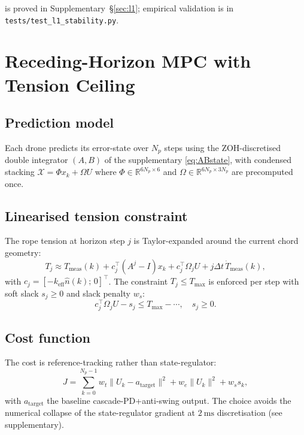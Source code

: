 \documentclass[journal,twocolumn,10pt]{IEEEtran}
\begin{document}
 is proved in Supplementary~§\ref{sec:l1};
empirical validation is in \texttt{tests/test\_l1\_stability.py}.

\section{Receding-Horizon MPC with Tension Ceiling}
\label{sec:mpc}

\subsection{Prediction model}
Each drone predicts its error-state over $N_p$ steps using the
ZOH-discretised double integrator $(A,B)$ of the supplementary
\eqref{eq:ABstate}, with condensed stacking
$\mathcal X = \Phi x_k + \Omega U$ where $\Phi\in\mathbb R^{6N_p\times 6}$
and $\Omega\in\mathbb R^{6N_p\times 3N_p}$ are precomputed once.

\subsection{Linearised tension constraint}
The rope tension at horizon step $j$ is Taylor-expanded around the
current chord geometry:
\begin{equation}
T_j \approx T_\text{meas}(k) + c_j^\top (A^j-I) x_k
                            + c_j^\top \Omega_j U
                            + j\Delta t\,\dot T_\text{meas}(k),
\label{eq:mpc-tension}
\end{equation}
with $c_j = [-k_\text{eff}\hat n(k);\,0]^\top$. The constraint
$T_j\le T_\text{max}$ is enforced per step with soft slack $s_j\ge 0$
and slack penalty $w_s$:
\begin{equation}
c_j^\top \Omega_j U - s_j \le T_\text{max} - \cdots,\quad s_j\ge 0.
\end{equation}

\subsection{Cost function}
The cost is reference-tracking rather than state-regulator:
\begin{equation}
J = \sum_{k=0}^{N_p-1} w_t \lVert U_k - a_\text{target}\rVert^2
  + w_e \lVert U_k\rVert^2 + w_s s_k,
\label{eq:mpc-cost}
\end{equation}
with $a_\text{target}$ the baseline cascade-PD+anti-swing output. The
choice avoids the numerical collapse of the state-regulator gradient
at $2~\si{\milli\second}$ discretisation (see supplementary).
\end{document}
